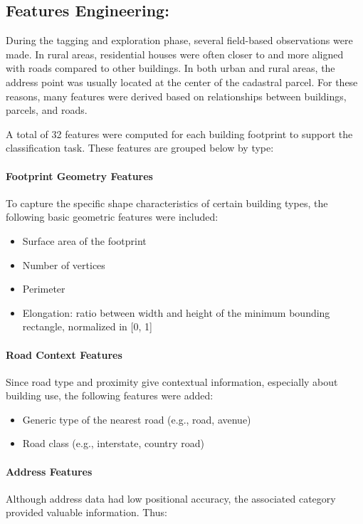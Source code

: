 \documentclass[11pt]{article}
\begin{document}
\subsection[\appendixname~\thesubsection]{Features Engineering:}

During the tagging and exploration phase, several field-based observations were made. In rural areas, residential houses were often closer to and more aligned with roads compared to other buildings. In both urban and rural areas, the address point was usually located at the center of the cadastral parcel. For these reasons, many features were derived based on relationships between buildings, parcels, and roads.

A total of 32 features were computed for each building footprint to support the classification task. These features are grouped below by type:

\paragraph{Footprint Geometry Features}
To capture the specific shape characteristics of certain building types, the following basic geometric features were included:

\begin{itemize}
    \item Surface area of the footprint
    \item Number of vertices
    \item Perimeter
    \item Elongation: ratio between width and height of the minimum bounding rectangle, normalized in [0, 1]
\end{itemize}

\paragraph{Road Context Features}
Since road type and proximity give contextual information, especially about building use, the following features were added:

\begin{itemize}
    \item Generic type of the nearest road (e.g., road, avenue)
    \item Road class (e.g., interstate, country road)
\end{itemize}

\paragraph{Address Features}
Although address data had low positional accuracy, the associated category provided valuable information. Thus:
\end{document}
